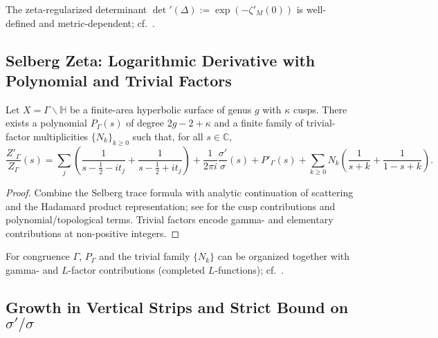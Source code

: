 \begin{remark}[Determinants] %
The zeta-regularized determinant \(\det{}'(\Delta):=\exp(-\zeta'_M(0))\) is well-defined and metric-dependent; cf.\ \cite{SarnakDet}. %
\end{remark}

\subsection{Selberg Zeta: Logarithmic Derivative with Polynomial and Trivial Factors} \label{subsec:Zprime} %

\begin{theorem} \label{thm:Zprime-expansion} %
Let \(X=\Gamma\backslash\mathbb H\) be a finite-area hyperbolic surface of genus \(g\) with \(\kappa\) cusps. There exists a polynomial \(P_\Gamma(s)\) of degree \(2g-2+\kappa\) and a finite family of trivial-factor multiplicities \(\{N_k\}_{k\ge0}\) such that, for all \(s\in\mathbb C\),
\begin{equation}\label{eq:Zprime-master}
  \frac{Z'_\Gamma}{Z_\Gamma}(s)
  = \sum_{j}\!\left(\frac{1}{s-\tfrac12-it_j}+\frac{1}{s-\tfrac12+it_j}\right)
    + \frac{1}{2\pi i}\frac{\sigma'}{\sigma}(s)
    + P'_\Gamma(s)
    + \sum_{k\ge0} N_k\!\left(\frac{1}{s+k}+\frac{1}{1-s+k}\right).
\end{equation}
\end{theorem}

\begin{proof}
Combine the Selberg trace formula with analytic continuation of scattering and the Hadamard product representation; see \cite{HejhalI,HejhalII,SelbergCollected, Iwaniec} for the cusp contributions and polynomial/topological terms. Trivial factors encode gamma- and elementary contributions at non-positive integers. %
\end{proof}

\begin{remark} %
For congruence \(\Gamma\), \(P_\Gamma\) and the trivial family \(\{N_k\}\) can be organized together with gamma- and \(L\)-factor contributions (completed \(L\)-functions); cf.\ \cite{Iwaniec,Kuznetsov}. %
\end{remark}

\subsection{Growth in Vertical Strips and Strict Bound on \(\sigma'/\sigma\)} \label{subsec:growth} %

